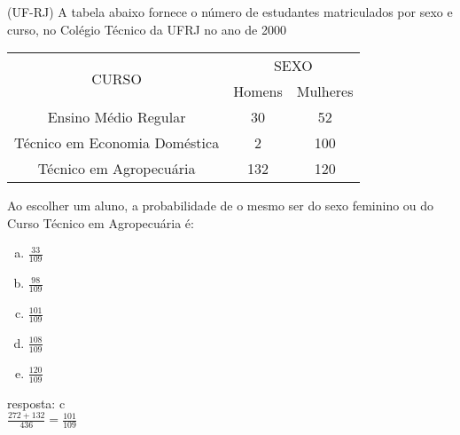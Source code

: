 \begin{ex}
 (UF-RJ) A tabela abaixo fornece o número de estudantes matriculados por sexo e curso, no Colégio Técnico da UFRJ no ano de 2000
\begin{center}
\begin{tabular} {|c|c|c|}\hline
\multirow{2}{*}{CURSO} & \multicolumn {2}{c|}{SEXO}\\ 
\cline{2-3}
& Homens & Mulheres \\ \hline
Ensino Médio Regular& 30 & 52\\ \hline
Técnico em Economia Doméstica & 2 & 100 \\ \hline
Técnico em Agropecuária & 132 & 120\\ \hline
\end{tabular}
\end{center}
Ao escolher um aluno, a probabilidade de o mesmo ser do sexo feminino ou do Curso Técnico em Agropecuária é:
    \begin{enumerate}[(a)]
    \item $\frac{33}{109}$
    \item $\frac{98}{109}$
    \item $\frac{101}{109}$
    \item $\frac{108}{109}$
    \item $\frac{120}{109}$
    \end{enumerate}
      \begin{sol}
        resposta: c \\
        $\frac{272+132}{436}=\frac{101}{109}$
      \end{sol}
\end{ex}